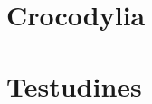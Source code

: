 \documentclass{article}
\begin{document}
\tableofcontents
\pagebreak
\section{Crocodylia}

\pagebreak

\pagebreak
\section{Testudines}

\pagebreak

\end{document}
